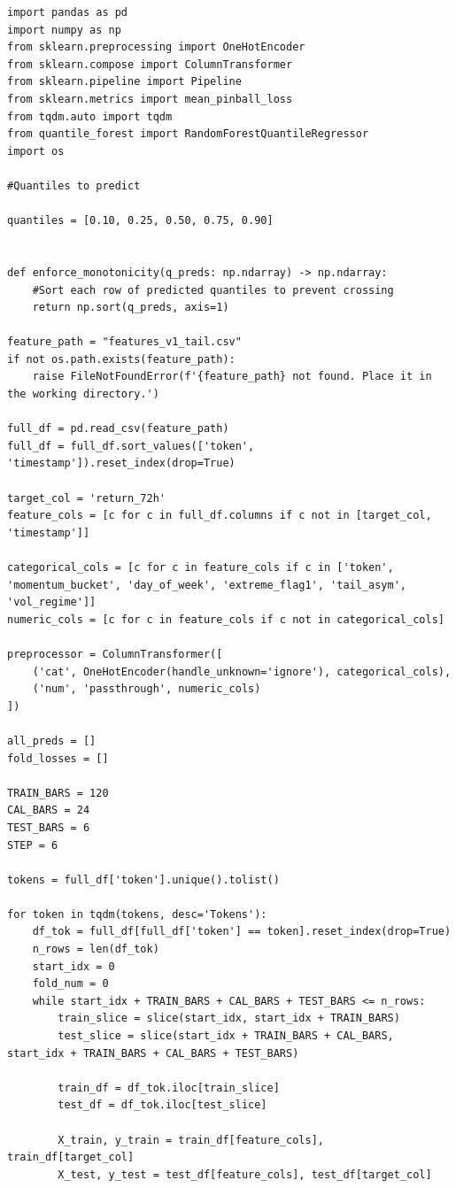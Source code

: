 \documentclass[
  a4paper,
  DIV=11,
  numbers=noendperiod]{scrreprt}
\begin{document}
\begin{verbatim}
import pandas as pd
import numpy as np
from sklearn.preprocessing import OneHotEncoder
from sklearn.compose import ColumnTransformer
from sklearn.pipeline import Pipeline
from sklearn.metrics import mean_pinball_loss
from tqdm.auto import tqdm
from quantile_forest import RandomForestQuantileRegressor
import os

#Quantiles to predict

quantiles = [0.10, 0.25, 0.50, 0.75, 0.90]


def enforce_monotonicity(q_preds: np.ndarray) -> np.ndarray:
    #Sort each row of predicted quantiles to prevent crossing
    return np.sort(q_preds, axis=1)

feature_path = "features_v1_tail.csv"
if not os.path.exists(feature_path):
    raise FileNotFoundError(f'{feature_path} not found. Place it in the working directory.')

full_df = pd.read_csv(feature_path)
full_df = full_df.sort_values(['token', 'timestamp']).reset_index(drop=True)

target_col = 'return_72h'
feature_cols = [c for c in full_df.columns if c not in [target_col, 'timestamp']]

categorical_cols = [c for c in feature_cols if c in ['token', 'momentum_bucket', 'day_of_week', 'extreme_flag1', 'tail_asym', 'vol_regime']]
numeric_cols = [c for c in feature_cols if c not in categorical_cols]

preprocessor = ColumnTransformer([
    ('cat', OneHotEncoder(handle_unknown='ignore'), categorical_cols),
    ('num', 'passthrough', numeric_cols)
])

all_preds = []
fold_losses = []

TRAIN_BARS = 120
CAL_BARS = 24
TEST_BARS = 6
STEP = 6

tokens = full_df['token'].unique().tolist()

for token in tqdm(tokens, desc='Tokens'):
    df_tok = full_df[full_df['token'] == token].reset_index(drop=True)
    n_rows = len(df_tok)
    start_idx = 0
    fold_num = 0
    while start_idx + TRAIN_BARS + CAL_BARS + TEST_BARS <= n_rows:
        train_slice = slice(start_idx, start_idx + TRAIN_BARS)
        test_slice = slice(start_idx + TRAIN_BARS + CAL_BARS, start_idx + TRAIN_BARS + CAL_BARS + TEST_BARS)

        train_df = df_tok.iloc[train_slice]
        test_df = df_tok.iloc[test_slice]

        X_train, y_train = train_df[feature_cols], train_df[target_col]
        X_test, y_test = test_df[feature_cols], test_df[target_col]


\end{verbatim}
\end{document}

